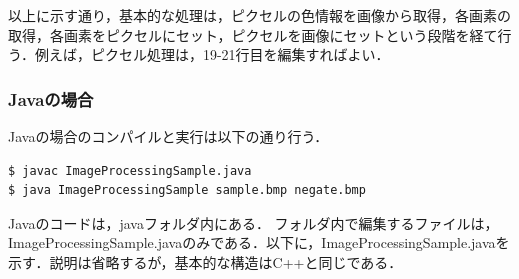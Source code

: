 ﻿\documentclass[11pt]{jsarticle}
\begin{document}
以上に示す通り，基本的な処理は，ピクセルの色情報を画像から取得，各画素の取得，各画素をピクセルにセット，ピクセルを画像にセットという段階を経て行う．例えば，ピクセル処理は，19-21行目を編集すればよい．
\subsubsection{Javaの場合}
Javaの場合のコンパイルと実行は以下の通り行う．
\begin{screen}
\begin{verbatim}
$ javac ImageProcessingSample.java
$ java ImageProcessingSample sample.bmp negate.bmp
\end{verbatim}
\end{screen}
Javaのコードは，javaフォルダ内にある．
フォルダ内で編集するファイルは，ImageProcessingSample.javaのみである．以下に，ImageProcessingSample.javaを示す．説明は省略するが，基本的な構造はC++と同じである．
\clearpage

\end{document}

